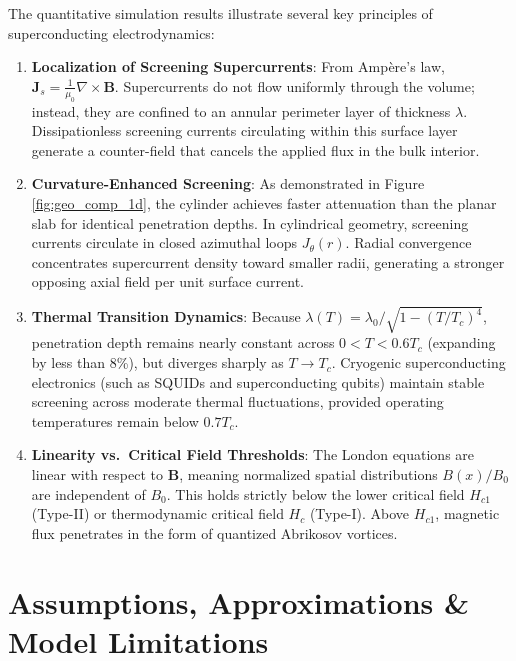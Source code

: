 \documentclass[11pt,a4paper]{article}
\begin{document}
The quantitative simulation results illustrate several key principles of superconducting electrodynamics:
\begin{enumerate}
    \item \textbf{Localization of Screening Supercurrents}: From Amp\`ere's law, $\mathbf{J}_s = \frac{1}{\mu_0} \nabla \times \mathbf{B}$. Supercurrents do not flow uniformly through the volume; instead, they are confined to an annular perimeter layer of thickness $\lambda$. Dissipationless screening currents circulating within this surface layer generate a counter-field that cancels the applied flux in the bulk interior.
    \item \textbf{Curvature-Enhanced Screening}: As demonstrated in Figure \ref{fig:geo_comp_1d}, the cylinder achieves faster attenuation than the planar slab for identical penetration depths. In cylindrical geometry, screening currents circulate in closed azimuthal loops $J_\theta(r)$. Radial convergence concentrates supercurrent density toward smaller radii, generating a stronger opposing axial field per unit surface current.
    \item \textbf{Thermal Transition Dynamics}: Because $\lambda(T) = \lambda_0 / \sqrt{1 - (T/T_c)^4}$, penetration depth remains nearly constant across $0 < T < 0.6 T_c$ (expanding by less than 8\%), but diverges sharply as $T \to T_c$. Cryogenic superconducting electronics (such as SQUIDs and superconducting qubits) maintain stable screening across moderate thermal fluctuations, provided operating temperatures remain below $0.7 T_c$.
    \item \textbf{Linearity vs.\ Critical Field Thresholds}: The London equations are linear with respect to $\mathbf{B}$, meaning normalized spatial distributions $B(x)/B_0$ are independent of $B_0$. This holds strictly below the lower critical field $H_{c1}$ (Type-II) or thermodynamic critical field $H_c$ (Type-I). Above $H_{c1}$, magnetic flux penetrates in the form of quantized Abrikosov vortices.
\end{enumerate}

\section{Assumptions, Approximations \& Model Limitations}
\end{document}
